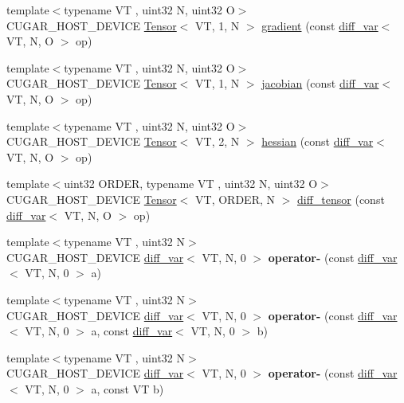 \begin{DoxyCompactItemize}
\item 
{\footnotesize template$<$typename VT , uint32 N, uint32 O$>$ }\\C\+U\+G\+A\+R\+\_\+\+H\+O\+S\+T\+\_\+\+D\+E\+V\+I\+CE \hyperlink{structcugar_1_1_tensor}{Tensor}$<$ VT, 1, N $>$ \hyperlink{group___auto_diff_module_ga1e2e54616fb22c1790370f97fe73c4f2}{gradient} (const \hyperlink{structcugar_1_1diff__var}{diff\+\_\+var}$<$ VT, N, O $>$ op)
\item 
{\footnotesize template$<$typename VT , uint32 N, uint32 O$>$ }\\C\+U\+G\+A\+R\+\_\+\+H\+O\+S\+T\+\_\+\+D\+E\+V\+I\+CE \hyperlink{structcugar_1_1_tensor}{Tensor}$<$ VT, 1, N $>$ \hyperlink{group___auto_diff_module_ga877e235be40a2961820c6caa2249adc7}{jacobian} (const \hyperlink{structcugar_1_1diff__var}{diff\+\_\+var}$<$ VT, N, O $>$ op)
\item 
{\footnotesize template$<$typename VT , uint32 N, uint32 O$>$ }\\C\+U\+G\+A\+R\+\_\+\+H\+O\+S\+T\+\_\+\+D\+E\+V\+I\+CE \hyperlink{structcugar_1_1_tensor}{Tensor}$<$ VT, 2, N $>$ \hyperlink{group___auto_diff_module_ga4805d8e3da7f18fc7305c77432e6519b}{hessian} (const \hyperlink{structcugar_1_1diff__var}{diff\+\_\+var}$<$ VT, N, O $>$ op)
\item 
{\footnotesize template$<$uint32 O\+R\+D\+ER, typename VT , uint32 N, uint32 O$>$ }\\C\+U\+G\+A\+R\+\_\+\+H\+O\+S\+T\+\_\+\+D\+E\+V\+I\+CE \hyperlink{structcugar_1_1_tensor}{Tensor}$<$ VT, O\+R\+D\+ER, N $>$ \hyperlink{group___auto_diff_module_gad3b328633420b6077be413a7cdfef6a8}{diff\+\_\+tensor} (const \hyperlink{structcugar_1_1diff__var}{diff\+\_\+var}$<$ VT, N, O $>$ op)
\item 
{\footnotesize template$<$typename VT , uint32 N$>$ }\\C\+U\+G\+A\+R\+\_\+\+H\+O\+S\+T\+\_\+\+D\+E\+V\+I\+CE \hyperlink{structcugar_1_1diff__var}{diff\+\_\+var}$<$ VT, N, 0 $>$ {\bfseries operator-\/} (const \hyperlink{structcugar_1_1diff__var}{diff\+\_\+var}$<$ VT, N, 0 $>$ a)
\item 
{\footnotesize template$<$typename VT , uint32 N$>$ }\\C\+U\+G\+A\+R\+\_\+\+H\+O\+S\+T\+\_\+\+D\+E\+V\+I\+CE \hyperlink{structcugar_1_1diff__var}{diff\+\_\+var}$<$ VT, N, 0 $>$ {\bfseries operator-\/} (const \hyperlink{structcugar_1_1diff__var}{diff\+\_\+var}$<$ VT, N, 0 $>$ a, const \hyperlink{structcugar_1_1diff__var}{diff\+\_\+var}$<$ VT, N, 0 $>$ b)
\item 
{\footnotesize template$<$typename VT , uint32 N$>$ }\\C\+U\+G\+A\+R\+\_\+\+H\+O\+S\+T\+\_\+\+D\+E\+V\+I\+CE \hyperlink{structcugar_1_1diff__var}{diff\+\_\+var}$<$ VT, N, 0 $>$ {\bfseries operator-\/} (const \hyperlink{structcugar_1_1diff__var}{diff\+\_\+var}$<$ VT, N, 0 $>$ a, const VT b)

\end{DoxyCompactItemize}
